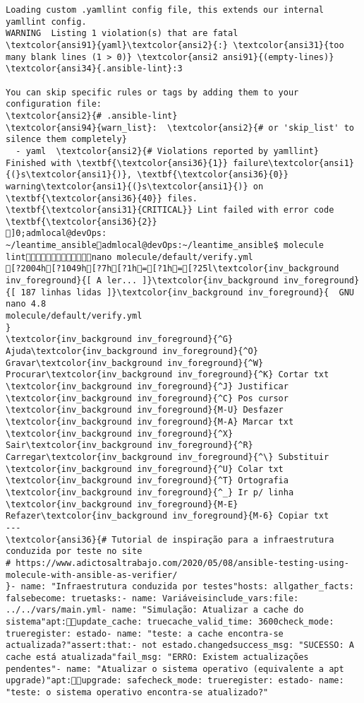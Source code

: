 \documentclass{scrartcl}
\begin{document}
\begin{Verbatim}
Loading custom .yamllint config file, this extends our internal yamllint config.
WARNING  Listing 1 violation(s) that are fatal
\textcolor{ansi91}{yaml}\textcolor{ansi2}{:} \textcolor{ansi31}{too many blank lines (1 > 0)} \textcolor{ansi2 ansi91}{(empty-lines)}
\textcolor{ansi34}{.ansible-lint}:3

You can skip specific rules or tags by adding them to your configuration file:
\textcolor{ansi2}{# .ansible-lint}
\textcolor{ansi94}{warn_list}:  \textcolor{ansi2}{# or 'skip_list' to silence them completely}
  - yaml  \textcolor{ansi2}{# Violations reported by yamllint}
Finished with \textbf{\textcolor{ansi36}{1}} failure\textcolor{ansi1}{(}s\textcolor{ansi1}{)}, \textbf{\textcolor{ansi36}{0}} warning\textcolor{ansi1}{(}s\textcolor{ansi1}{)} on \textbf{\textcolor{ansi36}{40}} files.
\textbf{\textcolor{ansi31}{CRITICAL}} Lint failed with error code \textbf{\textcolor{ansi36}{2}}
]0;admlocal@devOps: ~/leantime_ansibleadmlocal@devOps:~/leantime_ansible$ molecule lintnano molecule/default/verify.yml 
[?2004h[?1049h[?7h[?1h=[?1h=[?25l\textcolor{inv_background inv_foreground}{[ A ler... ]}\textcolor{inv_background inv_foreground}{[ 187 linhas lidas ]}\textcolor{inv_background inv_foreground}{  GNU nano 4.8                                          molecule/default/verify.yml                                                       }
\textcolor{inv_background inv_foreground}{^G} Ajuda\textcolor{inv_background inv_foreground}{^O} Gravar\textcolor{inv_background inv_foreground}{^W} Procurar\textcolor{inv_background inv_foreground}{^K} Cortar txt    \textcolor{inv_background inv_foreground}{^J} Justificar    \textcolor{inv_background inv_foreground}{^C} Pos cursor    \textcolor{inv_background inv_foreground}{M-U} Desfazer     \textcolor{inv_background inv_foreground}{M-A} Marcar txt
\textcolor{inv_background inv_foreground}{^X} Sair\textcolor{inv_background inv_foreground}{^R} Carregar\textcolor{inv_background inv_foreground}{^\} Substituir    \textcolor{inv_background inv_foreground}{^U} Colar txt     \textcolor{inv_background inv_foreground}{^T} Ortografia    \textcolor{inv_background inv_foreground}{^_} Ir p/ linha   \textcolor{inv_background inv_foreground}{M-E} Refazer\textcolor{inv_background inv_foreground}{M-6} Copiar txt
---
\textcolor{ansi36}{# Tutorial de inspiração para a infraestrutura conduzida por teste no site
# https://www.adictosaltrabajo.com/2020/05/08/ansible-testing-using-molecule-with-ansible-as-verifier/
}- name: "Infraestrutura conduzida por testes"hosts: allgather_facts: falsebecome: truetasks:- name: Variáveisinclude_vars:file: ../../vars/main.yml- name: "Simulação: Atualizar a cache do sistema"apt:update_cache: truecache_valid_time: 3600check_mode: trueregister: estado- name: "teste: a cache encontra-se actualizada?"assert:that:- not estado.changedsuccess_msg: "SUCESSO: A cache está atualizada"fail_msg: "ERRO: Existem actualizações pendentes"- name: "Atualizar o sistema operativo (equivalente a apt upgrade)"apt:upgrade: safecheck_mode: trueregister: estado- name: "teste: o sistema operativo encontra-se atualizado?"

\end{Verbatim}
\end{document}
